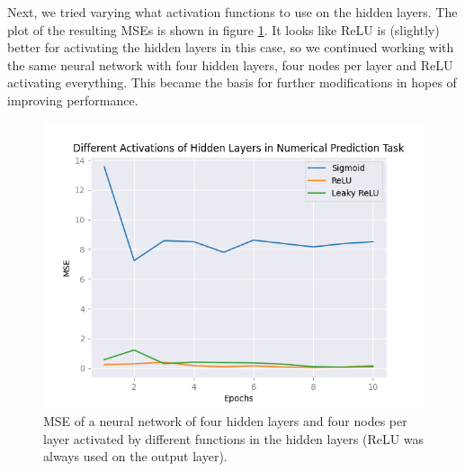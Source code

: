 Next, we tried varying what activation functions to use on the hidden layers. The plot of the resulting MSEs is shown in figure \ref{fig:activationfunctions_cost_numpred}. It looks like ReLU is (slightly) better for activating the hidden layers in this case, so we continued working with the same neural network with four hidden layers, four nodes per layer and ReLU activating everything. This became the basis for further modifications in hopes of improving performance. 
\begin{figure}
    \centering
    \includegraphics[width=\linewidth]{figures/all_plots/activationfunctions_cost_numpred.png}
    \caption{MSE of a neural network of four hidden layers and four nodes per layer activated by different functions in the hidden layers (ReLU was always used on the output layer).}
    \label{fig:activationfunctions_cost_numpred}
\end{figure}


